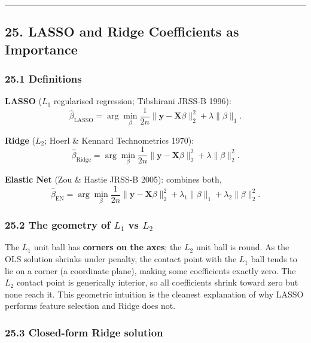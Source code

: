 \documentclass{article}
\begin{document}
\begin{center}\rule{0.5\linewidth}{0.5pt}\end{center}

\subsection{25. LASSO and Ridge Coefficients as
Importance}\label{25-lasso-and-ridge-coefficients-as-importance}

\subsubsection{25.1 Definitions}\label{251-definitions}

\textbf{LASSO} (\(L_1\) regularised regression; Tibshirani JRSS-B 1996):
\[
\hat{\beta}_{\mathrm{LASSO}} = \arg\min_\beta \frac{1}{2n}\|\mathbf{y} - \mathbf{X}\beta\|_2^2 + \lambda \|\beta\|_1.
\]

\textbf{Ridge} (\(L_2\); Hoerl \& Kennard Technometrics 1970): \[
\hat{\beta}_{\mathrm{Ridge}} = \arg\min_\beta \frac{1}{2n}\|\mathbf{y} - \mathbf{X}\beta\|_2^2 + \lambda \|\beta\|_2^2.
\]

\textbf{Elastic Net} (Zou \& Hastie JRSS-B 2005): combines both, \[
\hat{\beta}_{\mathrm{EN}} = \arg\min_\beta \frac{1}{2n}\|\mathbf{y} - \mathbf{X}\beta\|_2^2 + \lambda_1 \|\beta\|_1 + \lambda_2 \|\beta\|_2^2.
\]

\subsubsection{\texorpdfstring{25.2 The geometry of \(L_1\) vs
\(L_2\)}{25.2 The geometry of L\_1 vs L\_2}}\label{252-the-geometry-of-l_1-vs-l_2}

The \(L_1\) unit ball has \textbf{corners on the axes}; the \(L_2\) unit
ball is round. As the OLS solution shrinks under penalty, the contact
point with the \(L_1\) ball tends to lie on a corner (a coordinate
plane), making some coefficients exactly zero. The \(L_2\) contact point
is generically interior, so all coefficients shrink toward zero but none
reach it. This geometric intuition is the cleanest explanation of why
LASSO performs feature selection and Ridge does not.

\subsubsection{25.3 Closed-form Ridge
solution}\label{253-closed-form-ridge-solution}
\end{document}
